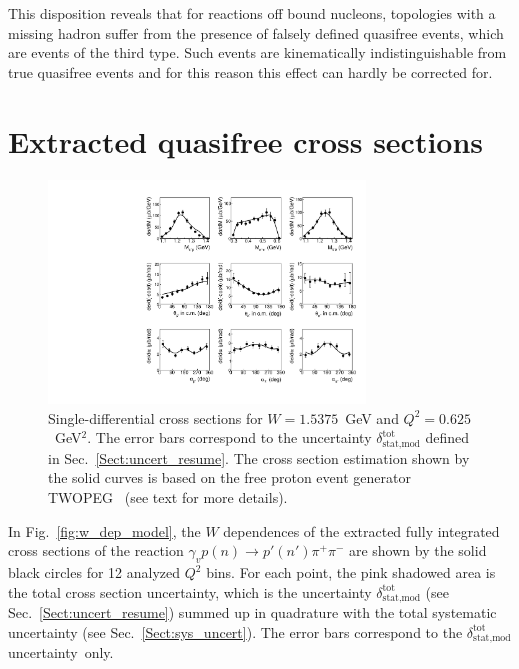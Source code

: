 \documentclass[prc,twocolumn,superscriptaddress,showpacs,amssymb,amsmath,amsfonts,aps,nofootinbib]{revtex4-1}
\begin{document}
This disposition reveals that for reactions off bound nucleons, topologies with a missing hadron suffer from the presence of falsely defined quasifree events, which are events of the third type. Such events are kinematically indistinguishable from true quasifree events and for this reason this effect can hardly be corrected for.



\section{Extracted quasifree cross sections}
\label{Sect:cr_sect_qf}


\begin{figure}[htp]
\begin{center}
\includegraphics[width=0.75\textwidth]{pictures/diff_model2.pdf}
\caption{\small Single-differential cross sections for $W= 1.5375$~GeV and $Q^{2}= 0.625$~GeV$^{2}$. The error bars correspond to the uncertainty $\delta_{\text{stat,mod}}^{\text{tot}}$ defined in Sec.\!~\ref{Sect:uncert_resume}. The cross section estimation shown by the solid curves is based on the free proton event generator TWOPEG~\cite{twopeg} (see text for more details).} \label{fig:diff_model}
\end{center}
\end{figure}

In Fig.\!~\ref{fig:w_dep_model}, the $W$ dependences of the extracted fully integrated cross sections of the reaction $\gamma_{v} p (n) \rightarrow p' (n') \pi^{+} \pi^{-}$ are shown by the solid black circles for 12 analyzed $Q^{2}$ bins. For each point, the pink shadowed area is the total cross section uncertainty, which is the uncertainty $\delta_{\text{stat,mod}}^{\text{tot}}$ (see Sec.\!~\ref{Sect:uncert_resume}) summed up in quadrature with the total systematic uncertainty (see Sec.\!~\ref{Sect:sys_uncert}). The error bars correspond to the $\delta_{\text{stat,mod}}^{\text{tot}}$ uncertainty~only.
\end{document}
